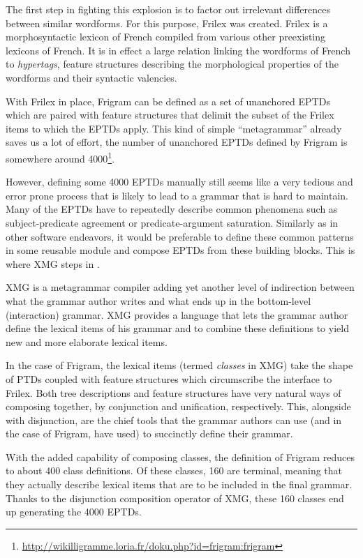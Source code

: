 The first step in fighting this explosion is to factor out irrelevant
differences between similar wordforms. For this purpose, Frilex was
created. Frilex is a morphosyntactic lexicon of French compiled from
various other preexisting lexicons of French. It is in effect a large
relation linking the wordforms of French to \emph{hypertags}, feature
structures describing the morphological properties of the wordforms and
their syntactic valencies.

With Frilex in place, Frigram can be defined as a set of unanchored
EPTDs which are paired with feature structures that delimit the subset
of the Frilex items to which the EPTDs apply. This kind of simple
``metagrammar'' already saves us a lot of effort, the number of
unanchored EPTDs defined by Frigram is somewhere around
4000\footnote{\url{http://wikilligramme.loria.fr/doku.php?id=frigram:frigram}}.

However, defining some 4000 EPTDs manually still seems like a very
tedious and error prone process that is likely to lead to a grammar that
is hard to maintain. Many of the EPTDs have to repeatedly describe
common phenomena such as subject-predicate agreement or
predicate-argument saturation. Similarly as in other software endeavors,
it would be preferable to define these common patterns in some reusable
module and compose EPTDs from these building blocks. This is where XMG
steps in \cite{duchier2012metagrammars}.

XMG is a metagrammar compiler adding yet another level of indirection
between what the grammar author writes and what ends up in the
bottom-level (interaction) grammar. XMG provides a language that lets
the grammar author define the lexical items of his grammar and to
combine these definitions to yield new and more elaborate lexical items.

In the case of Frigram, the lexical items (termed \emph{classes} in XMG)
take the shape of PTDs coupled with feature structures which
circumscribe the interface to Frilex. Both tree descriptions and feature
structures have very natural ways of composing together, by conjunction
and unification, respectively. This, alongside with disjunction, are the
chief tools that the grammar authors can use (and in the case of
Frigram, have used) to succinctly define their grammar.

With the added capability of composing classes, the definition of
Frigram reduces to about 400 class definitions. Of these classes, 160
are terminal, meaning that they actually describe lexical items that are
to be included in the final grammar. Thanks to the disjunction
composition operator of XMG, these 160 classes end up generating the
4000 EPTDs.


